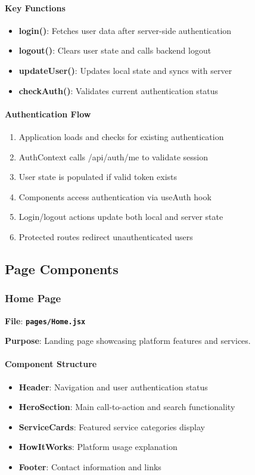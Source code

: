 \documentclass[12pt,a4paper]{article}
\newcommand{\file}[1]{\textbf{\texttt{#1}}}
\begin{document}
\paragraph{Key Functions}
\begin{itemize}
\item \textbf{login()}: Fetches user data after server-side authentication
\item \textbf{logout()}: Clears user state and calls backend logout
\item \textbf{updateUser()}: Updates local state and syncs with server
\item \textbf{checkAuth()}: Validates current authentication status
\end{itemize}

\paragraph{Authentication Flow}
\begin{enumerate}
\item Application loads and checks for existing authentication
\item AuthContext calls /api/auth/me to validate session
\item User state is populated if valid token exists
\item Components access authentication via useAuth hook
\item Login/logout actions update both local and server state
\item Protected routes redirect unauthenticated users
\end{enumerate}

\subsection{Page Components}
\label{subsec:page-components}

\subsubsection{Home Page}
\label{subsubsec:home-page}

\textbf{File}: \file{pages/Home.jsx}

\textbf{Purpose}: Landing page showcasing platform features and services.

\paragraph{Component Structure}
\begin{itemize}
\item \textbf{Header}: Navigation and user authentication status
\item \textbf{HeroSection}: Main call-to-action and search functionality
\item \textbf{ServiceCards}: Featured service categories display
\item \textbf{HowItWorks}: Platform usage explanation
\item \textbf{Footer}: Contact information and links
\end{itemize}
\end{document}
